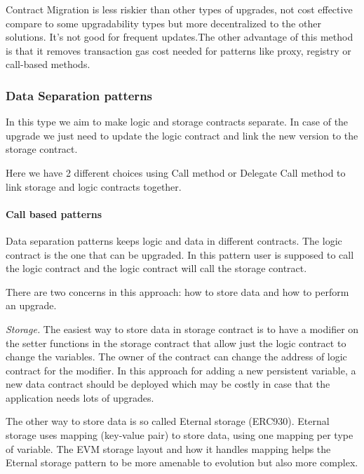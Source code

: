 Contract Migration is less riskier than other types of upgrades, not cost effective compare to some upgradability types but more decentralized to the other solutions. It's not good for frequent updates.The other advantage of this method is that it removes transaction gas cost needed for patterns like proxy, registry or call-based methods.




\subsubsection{Data Separation patterns}
In this type we aim to make logic and storage contracts separate. In case of the upgrade we just need to update the logic contract and link the new version to the storage contract.

Here we have 2 different choices using Call method or Delegate Call method to link storage and logic contracts together.

\paragraph{Call based patterns}

Data separation patterns keeps logic and data in different contracts. The logic contract is the one that can be upgraded. In this pattern user is supposed to call the logic contract and the logic contract will call the storage contract.

There are two concerns in this approach: how to store data and how to perform an upgrade.

\textit{Storage. }The easiest way to store data in storage contract is to have a modifier on the setter functions in the storage contract that allow just the logic contract to change the variables. The owner of the contract can change the address of logic contract for the modifier.
In this approach for adding a new persistent variable, a new data contract should be deployed which may be costly in case that the application needs lots of upgrades.

The other way to store data is so called Eternal storage (ERC930). Eternal storage uses mapping (key-value pair) to store data, using one mapping per type of variable. The EVM storage layout and how it handles mapping helps the Eternal storage pattern to be more amenable to evolution but also more complex.

